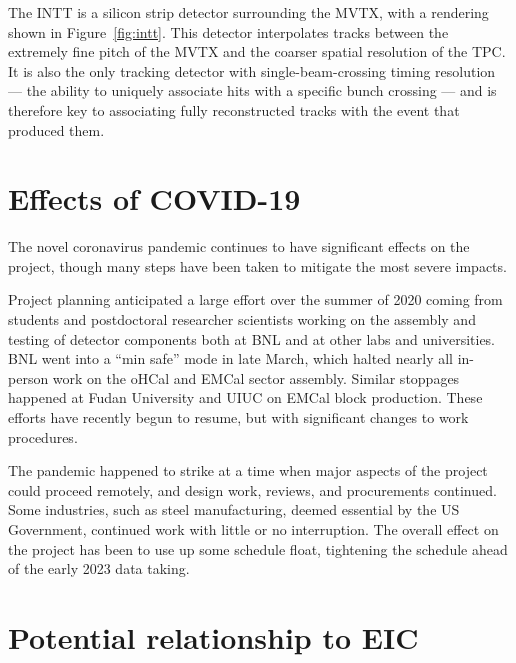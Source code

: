 The INTT is a silicon strip detector surrounding the MVTX, with a rendering shown in
Figure~\ref{fig:intt}.  This detector interpolates tracks between the
extremely fine pitch of the MVTX and the coarser spatial
resolution of the TPC.  It is also the only tracking detector with
single-beam-crossing timing resolution --- the ability to uniquely associate
hits with a specific bunch crossing --- and is therefore key to
associating fully reconstructed tracks with the event that produced
them.

\section{Effects of COVID-19}
\label{sec:covid}

The novel coronavirus pandemic continues to have significant effects on the
project, though many steps have been taken to mitigate the most severe
impacts.

Project planning anticipated a large effort over the summer of 2020
coming from students and postdoctoral researcher scientists working on the assembly and testing
of detector components both at BNL and at other labs and universities.
BNL went into a ``min safe'' mode in late March, which halted nearly
all in-person work on the oHCal and EMCal sector assembly.  Similar
stoppages happened at Fudan University and UIUC on EMCal block
production.  These efforts have recently begun to resume, but with
significant changes to work procedures.

The pandemic happened to strike at a time when major aspects of the
project could proceed remotely, and design work, reviews, and procurements continued.  
Some industries, such
as steel manufacturing, deemed essential by the US Government,
continued work with little or no interruption.  
The overall effect on the project has been to use up some schedule float,
tightening the schedule ahead of the early 2023 data taking.

\section{Potential relationship to EIC}
\label{sec:eic}

